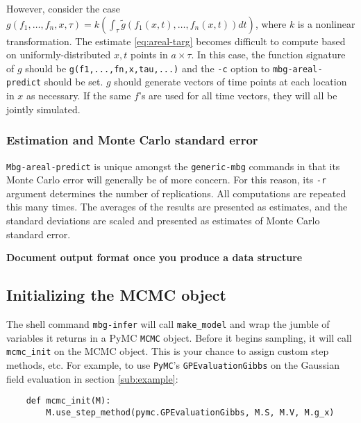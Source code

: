 However, consider the case $g(f_1,\ldots,f_n,x,\tau)=k(\int_\tau\tilde g(f_1(x,t),\ldots,f_n(x,t))dt)$, where $k$ is a nonlinear transformation. The estimate \ref{eq:areal-targ} becomes difficult to compute based on uniformly-distributed $x,t$ points in $a\times \tau$. In this case, the function signature of $g$ should be \texttt{g(f1,...,fn,x,tau,...)} and the \texttt{-c} option to \texttt{mbg-areal-predict} should be set. $g$ should generate vectors of time points at each location in $x$ as necessary. If the same $f$'s are used for all time vectors, they will all be jointly simulated.

\subsubsection{Estimation and Monte Carlo standard error}
\texttt{Mbg-areal-predict} is unique amongst the \texttt{generic-mbg} commands in that its Monte Carlo error will generally be of more concern. For this reason, its \texttt{-r} argument determines the number of replications. All computations are repeated this many times. The averages of the results are presented as estimates, and the standard deviations are scaled and presented as estimates of Monte Carlo standard error.

\textbf{Document output format once you produce a data structure}

\subsection{Initializing the MCMC object}
\label{sub:mcmc-init} 

The shell command \texttt{mbg-infer} will call \texttt{make\_model} and wrap the jumble of variables it returns in a PyMC \texttt{MCMC} object. Before it begins sampling, it will call \texttt{mcmc\_init} on the MCMC object. This is your chance to assign custom step methods, etc. For example, to use \texttt{PyMC}'s \texttt{GPEvaluationGibbs} on the Gaussian field evaluation in section \ref{sub:example}:
\begin{verbatim}
    def mcmc_init(M):
        M.use_step_method(pymc.GPEvaluationGibbs, M.S, M.V, M.g_x)
\end{verbatim}



